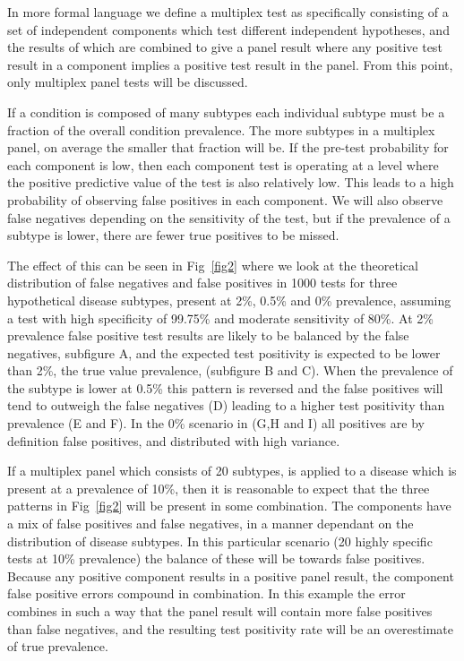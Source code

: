 \documentclass[10pt,letterpaper]{article}
\begin{document}
In more formal language we define a multiplex test as specifically consisting of a set of independent components which test different independent hypotheses, and the results of which are combined to give a panel result where any positive test result in a component implies a positive test result in the panel. From this point, only multiplex panel tests will be discussed.

If a condition is composed of many subtypes each individual subtype must be a fraction of the overall condition prevalence. The more subtypes in a multiplex panel, on average the smaller that fraction will be. If the pre-test probability for each component is low, then each component test is operating at a level where the positive predictive value of the test is also relatively low. This leads to a high probability of observing false positives in each component. We will also observe false negatives depending on the sensitivity of the test, but if the prevalence of a subtype is lower, there are fewer true positives to be missed.

The effect of this can be seen in Fig~\ref{fig2} where we look at the theoretical distribution of false negatives and false positives in 1000 tests for three hypothetical disease subtypes, present at 2\%, 0.5\% and 0\% prevalence, assuming a test with high specificity of 99.75\% and moderate sensitivity of 80\%. At 2\% prevalence false positive test results are likely to be balanced by the false negatives, subfigure A, and the expected test positivity is expected to be lower than 2\%, the true value prevalence, (subfigure B and C). When the prevalence of the subtype is lower at 0.5\% this pattern is reversed and the false positives will tend to outweigh the false negatives (D) leading to a higher test positivity than prevalence (E and F). In the 0\% scenario in (G,H and I) all positives are by definition false positives, and distributed with high variance.

If a multiplex panel which consists of 20 subtypes, is applied to a disease which is present at a prevalence of 10\%, then it is reasonable to expect that the three patterns in Fig~\ref{fig2} will be present in some combination. The components have a mix of false positives and false negatives, in a manner dependant on the distribution of disease subtypes. In this particular scenario (20 highly specific tests at 10\% prevalence) the balance of these will be towards false positives. Because any positive component results in a positive panel result, the component false positive errors compound in combination. In this example the error combines in such a way that the panel result will contain more false positives than false negatives, and the resulting test positivity rate will be an overestimate of true prevalence.
\end{document}
